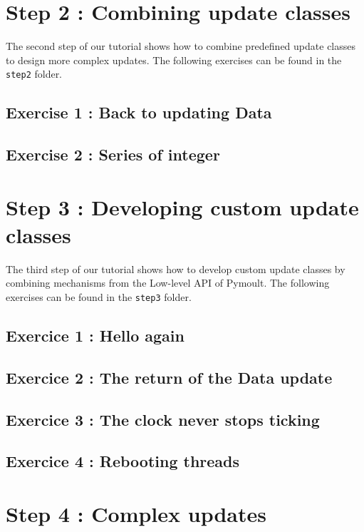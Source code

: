 \documentclass{article}
\begin{document}
\section{Step 2 : Combining update classes} 

The second step of our tutorial shows how to combine predefined update
classes to design more complex updates. The following exercises can be
found in the \texttt{step2} folder.

\subsection{Exercise 1 : Back to updating Data}







\subsection{Exercise 2 : Series of integer}


\section{Step 3 : Developing custom update classes}

The third step of our tutorial shows how to develop custom update
classes by combining mechanisms from the Low-level API of Pymoult. The
following exercises can be found in the \texttt{step3} folder.

\subsection{Exercice 1 : Hello again}

\subsection{Exercice 2 : The return of the Data update}

\subsection{Exercice 3 : The clock never stops ticking}

\subsection{Exercice 4 : Rebooting threads}


\section{Step 4 : Complex updates}
\end{document}

